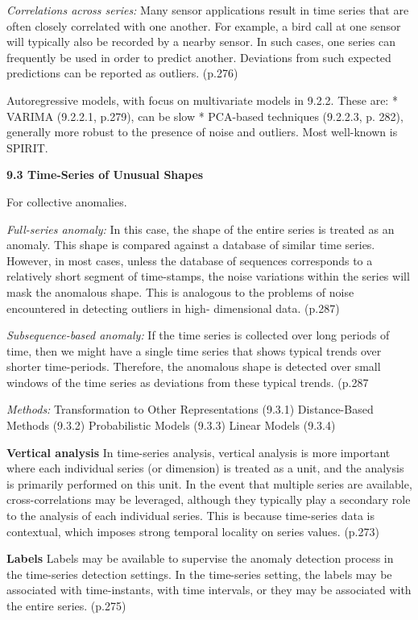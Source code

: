 \textit{Correlations across series:} Many sensor applications result in time series that are often closely correlated with one another. For example, a bird call at one sensor will typically also be recorded by a nearby sensor. In such cases, one series can frequently be used in order to predict another. Deviations from such expected predictions can be reported as outliers. (p.276)

Autoregressive models, with focus on multivariate models in 9.2.2. These are: \newline
* VARIMA (9.2.2.1, p.279), can be slow \newline
* PCA-based techniques (9.2.2.3, p. 282), generally more robust to the presence of noise and outliers. Most well-known is SPIRIT.

\textbf{9.3 Time-Series of Unusual Shapes}

For collective anomalies.

\textit{Full-series anomaly:} In this case, the shape of the entire series is treated as an anomaly. This shape is compared against a database of similar time series. However, in most cases, unless the database of sequences corresponds to a relatively short segment of time-stamps, the noise variations within the series will mask the anomalous shape. This is analogous to the problems of noise encountered in detecting outliers in high- dimensional data. (p.287)

\textit{Subsequence-based anomaly:} If the time series is collected over long periods of time, then we might have a single time series that shows typical trends over shorter time-periods. Therefore, the anomalous shape is detected over small windows of the time series as deviations from these typical trends. (p.287

\textit{Methods: }
Transformation to Other Representations (9.3.1)
Distance-Based Methods (9.3.2)
Probabilistic Models (9.3.3)
Linear Models (9.3.4)



\textbf{Vertical analysis}
In time-series analysis, vertical analysis is more important where each individual series (or dimension) is treated as a unit, and the analysis is primarily performed on this unit. In the event that multiple series are available, cross-correlations may be leveraged, although they typically play a secondary role to the analysis of each individual series. This is because time-series data is contextual, which imposes strong temporal locality on series values.  (p.273)

\textbf{Labels}
Labels may be available to supervise the anomaly detection process in the time-series detection settings. In the time-series setting, the labels may be associated with time-instants, with time intervals, or they may be associated with the entire series. (p.275)

